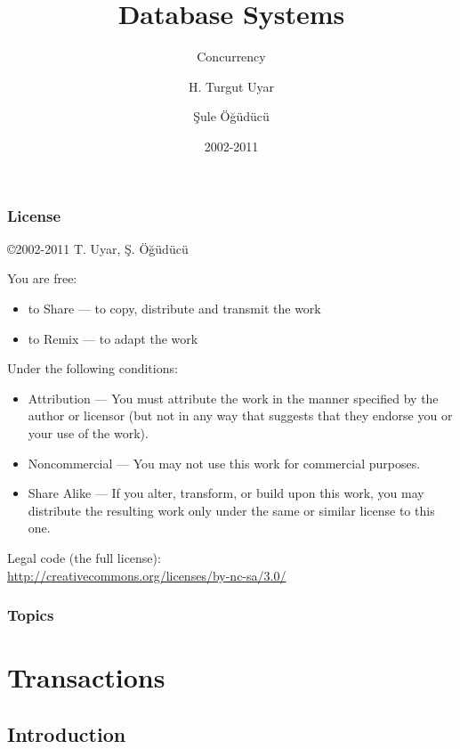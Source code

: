 \documentclass[dvipsnames]{beamer}
\title{Database Systems}
\subtitle{Concurrency}
\author{H. Turgut Uyar \and Şule Öğüdücü}
\date{2002-2011}
\theoremstyle{plain}
\begin{document}
\begin{frame}
  \titlepage
\end{frame}

\begin{frame}
  \frametitle{License}

  \hfill
  \copyright 2002-2011 T. Uyar, Ş. Öğüdücü

  \vfill
  \begin{tiny}
    You are free:
    \begin{itemize}
      \item to Share — to copy, distribute and transmit the work
      \item to Remix — to adapt the work
    \end{itemize}

    Under the following conditions:
    \begin{itemize}
      \item Attribution — You must attribute the work in the manner specified by
        the author or licensor (but not in any way that suggests that they
        endorse you or your use of the work).

      \item Noncommercial — You may not use this work for commercial purposes.

      \item Share Alike — If you alter, transform, or build upon this work, you
        may distribute the resulting work only under the same or similar license
        to this one.
    \end{itemize}
  \end{tiny}

  \vfill
  Legal code (the full license):\\
  \url{http://creativecommons.org/licenses/by-nc-sa/3.0/}
\end{frame}

\begin{frame}
  \frametitle{Topics}
  \tableofcontents
\end{frame}

\section{Transactions}

\subsection{Introduction}
\end{document}
